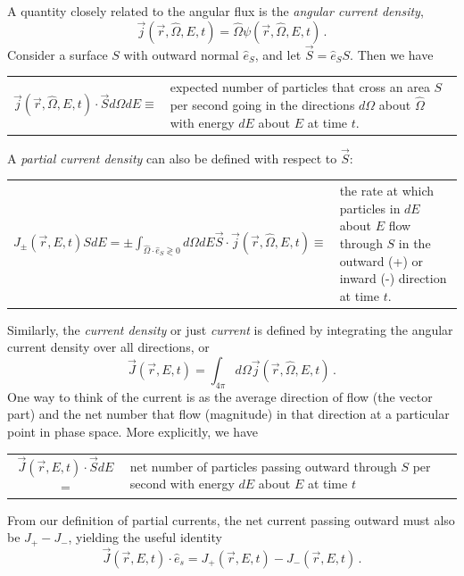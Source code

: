 A quantity closely related to the angular flux is the \textit{angular 
current density},
\begin{equation}
  \vec{j}(\vec{r},\hat{\Omega},E,t) = \hat{\Omega}\psi (\vec{r},\hat{\Omega},E,t)  \, .
\end{equation}
Consider a surface $S$ with outward normal $\hat{e}_S$, and 
let $\vec{S} = \hat{e}_S S$.  Then we have
\begin{center}
  \begin{tabular}{cp{5.0cm}}
    $\vec{j}(\vec{r},\hat{\Omega},E,t) \cdot \vec{S} d\Omega dE \equiv$&
    expected number of particles that cross an area $S$ per second going in the 
    directions $d\Omega$ about $\hat{\Omega}$ with energy  
    $dE$ about  $E$ at time $t$.
  \end{tabular}
\end{center}
A \textit{partial current density} can also be defined with respect to $\vec{S}$:
\begin{center}
  \begin{tabular}{cp{4.3cm}}
    $J_{\pm}(\vec{r},E,t)SdE = 
      \pm \int_{\hat{\Omega} \cdot \hat{e}_S \gtrless 0} d\Omega dE  \vec{S} 
        \cdot \vec{j} (\vec{r},\hat{\Omega},E,t) \equiv $ &
          the rate at which particles in $dE$ about $E$ flow through $S$ in 
          the outward (+) or inward (-) direction at time $t$.
  \end{tabular}
\end{center}

Similarly, the \textit{current density} or just \textit{current} is defined by
 integrating the angular current density over all directions, or
\begin{equation}
 \vec{J}(\vec{r},E,t) = \int_{4\pi} d\Omega \vec{j}(\vec{r},\hat{\Omega},E,t) \, .
\end{equation}
One way to think of the current is as the average direction of flow (the 
vector part) and the net number that flow (magnitude) in that direction 
at a particular point in 
phase space.  More explicitly, we have
\begin{center}
  \begin{tabular}{cp{5.0cm}}
    $\vec{J}(\vec{r},E,t) \cdot \vec{S} dE $ = &
    net number of particles passing outward through $S$ per second with energy 
$dE$ about $E$ at time $t$
  \end{tabular}
\end{center}
From our definition of partial currents, the net current passing outward must 
also be $J_+ - J_-$, yielding the useful identity
\begin{equation}
 \vec{J}(\vec{r},E,t) \cdot \hat{e}_s = J_{+}(\vec{r},E,t) - J_{-}(\vec{r},E,t) \, .
 \label{eq:net2partial}
\end{equation}

